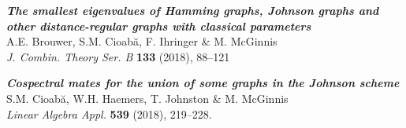 \vspace*{-12pt}
\begin{cventries}
\cventry
  {}
  {}
  {}
  {}
  {
    \begin{cvitems}
      \item \textbf{\em{The smallest eigenvalues of Hamming graphs, Johnson graphs and other distance-regular graphs with classical parameters}} \\
	    A.E. Brouwer, S.M. Cioab\u{a}, F. Ihringer \& M. McGinnis \\
		{\em J. Combin. Theory Ser. B} {\bf 133} (2018), 88--121 
	    \vspace*{5pt}
      \item \textbf{\em{Cospectral mates for the union of some graphs in the Johnson scheme}} \\
	    S.M. Cioab\u{a}, W.H. Haemers, T. Johnston \& M. McGinnis \\
            {\em Linear Algebra Appl.} {\bf 539} (2018), 219--228.
    \end{cvitems}
  }
\end{cventries}
\vspace*{-2pt}
